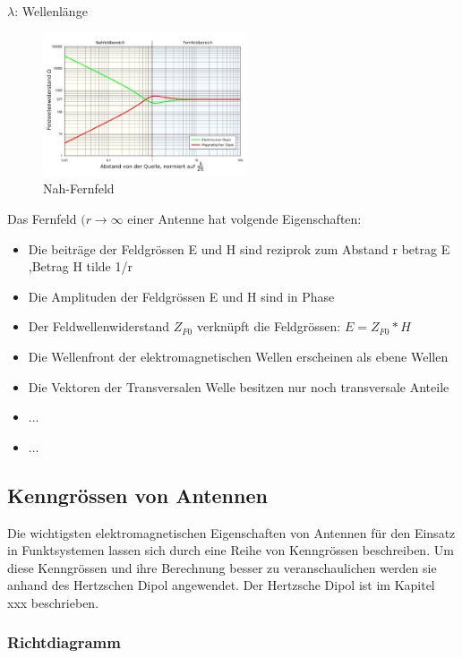 $\lambda$: Wellenlänge
\begin{figure}[htbp]
	\centering
		\includegraphics[width=6cm]{content/bilder/Feldwellenwiderstandsverlauf_im_Nahfeld-Fernfeld.pdf}
	\caption{Nah-Fernfeld}%
	\label{Nah-Fernfeld}
\end{figure}
Das Fernfeld $(r \rightarrow \infty$ einer Antenne hat volgende Eigenschaften:

\begin{itemize}
\item Die beiträge der Feldgrössen E und H sind reziprok zum Abstand r betrag E ,Betrag H tilde 1/r
\item Die Amplituden der Feldgrössen E und H sind in Phase
\item Der Feldwellenwiderstand $Z_{F0}$ verknüpft die Feldgrössen: $ E=Z_{F0}*H$
\item Die Wellenfront der elektromagnetischen Wellen erscheinen als ebene Wellen
\item Die Vektoren der Transversalen Welle besitzen nur noch transversale Anteile
\item ...
\item ...
\end{itemize}
\subsection{Kenngrössen von Antennen}
Die wichtigsten elektromagnetischen Eigenschaften von Antennen für den Einsatz in Funktsystemen lassen sich durch eine Reihe von Kenngrössen beschreiben. Um diese Kenngrössen und ihre Berechnung besser zu veranschaulichen werden sie anhand des Hertzschen Dipol angewendet. Der Hertzsche Dipol ist im Kapitel xxx beschrieben. 
\subsubsection{Richtdiagramm}

